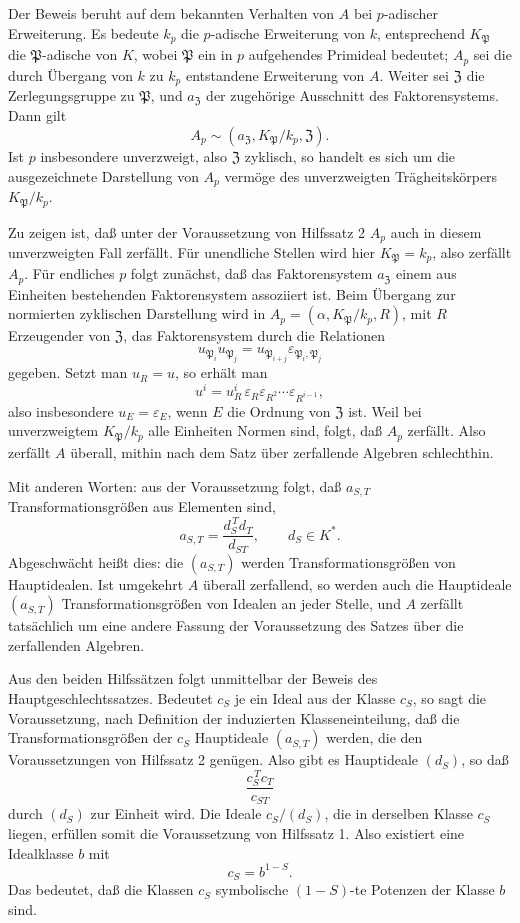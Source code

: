 \documentclass[11pt]{article}
\providecommand{\PP}{\mathfrak P}
\begin{document}
Der Beweis beruht auf dem bekannten Verhalten von \(A\) bei \(p\)-adischer Erweiterung. Es bedeute \(k_p\) die \(p\)-adische Erweiterung von \(k\), entsprechend \(K_\PP\) die \(\PP\)-adische von \(K\), wobei \(\PP\) ein in \(p\) aufgehendes Primideal bedeutet; \(A_p\) sei die durch Übergang von \(k\) zu \(k_p\) entstandene Erweiterung von \(A\). Weiter sei \(\mathfrak Z\) die Zerlegungsgruppe zu \(\PP\), und \(a_{\mathfrak Z}\) der zugehörige Ausschnitt des Faktorensystems. Dann gilt
\[
        A_p\sim (a_{\mathfrak Z},K_\PP/k_p,\mathfrak Z).
\]
Ist \(p\) insbesondere unverzweigt, also \(\mathfrak Z\) zyklisch, so handelt es sich um die ausgezeichnete Darstellung von \(A_p\) vermöge des unverzweigten Trägheitskörpers \(K_\PP/k_p\).

Zu zeigen ist, daß unter der Voraussetzung von Hilfssatz 2 \(A_p\) auch in diesem unverzweigten Fall zerfällt. Für unendliche Stellen wird hier \(K_\PP=k_p\), also zerfällt \(A_p\). Für endliches \(p\) folgt zunächst, daß das Faktorensystem \(a_{\mathfrak Z}\) einem aus Einheiten bestehenden Faktorensystem assoziiert ist. Beim Übergang zur normierten zyklischen Darstellung wird in \(A_p=(\alpha,K_\PP/k_p,R)\), mit \(R\) Erzeugender von \(\mathfrak Z\), das Faktorensystem durch die Relationen
\[
        u_{\PP_i}u_{\PP_j}=u_{\PP_{i+j}}\varepsilon_{\PP_i,\PP_j}
\]
gegeben. Setzt man \(u_R=u\), so erhält man
\[
        u^i=u_R^i\,\varepsilon_R\varepsilon_{R^2}\cdots \varepsilon_{R^{i-1}},
\]
also insbesondere \(u_E=\varepsilon_E\), wenn \(E\) die Ordnung von \(\mathfrak Z\) ist. Weil bei unverzweigtem \(K_\PP/k_p\) alle Einheiten Normen sind, folgt, daß \(A_p\) zerfällt. Also zerfällt \(A\) überall, mithin nach dem Satz über zerfallende Algebren schlechthin.

Mit anderen Worten: aus der Voraussetzung folgt, daß \(a_{S,T}\) Transformationsgrößen aus Elementen sind,
\[
        a_{S,T}=\frac{d_S^{\,T}d_T}{d_{ST}},
        \qquad d_S\in K^*.
\]
Abgeschwächt heißt dies: die \((a_{S,T})\) werden Transformationsgrößen von Hauptidealen. Ist umgekehrt \(A\) überall zerfallend, so werden auch die Hauptideale \((a_{S,T})\) Transformationsgrößen von Idealen an jeder Stelle, und \(A\) zerfällt tatsächlich um eine andere Fassung der Voraussetzung des Satzes über die zerfallenden Algebren.

Aus den beiden Hilfssätzen folgt unmittelbar der Beweis des Hauptgeschlechtssatzes. Bedeutet \(c_S\) je ein Ideal aus der Klasse \(c_S\), so sagt die Voraussetzung, nach Definition der induzierten Klasseneinteilung, daß die Transformationsgrößen der \(c_S\) Hauptideale \((a_{S,T})\) werden, die den Voraussetzungen von Hilfssatz 2 genügen. Also gibt es Hauptideale \((d_S)\), so daß
\[
        \frac{c_S^{\,T}c_T}{c_{ST}}
\]
durch \((d_S)\) zur Einheit wird. Die Ideale \(c_S/(d_S)\), die in derselben Klasse \(c_S\) liegen, erfüllen somit die Voraussetzung von Hilfssatz 1. Also existiert eine Idealklasse \(b\) mit
\[
        c_S=b^{1-S}.
\]
Das bedeutet, daß die Klassen \(c_S\) symbolische \((1-S)\)-te Potenzen der Klasse \(b\) sind.
\end{document}
